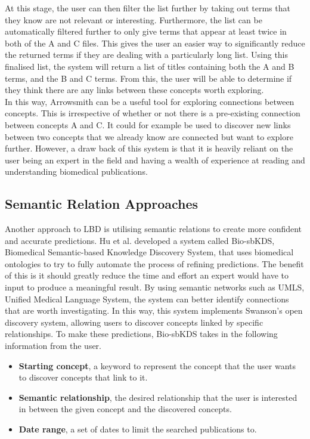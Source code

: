 \documentclass{l4proj}
\begin{document}
At this stage, the user can then filter the list further by taking out terms that they know are not relevant or interesting. Furthermore, the list can be automatically filtered further to only give terms that appear at least twice in both of the A and C files. This gives the user an easier way to significantly reduce the returned terms if they are dealing with a particularly long list. Using this finalised list, the system will return a list of titles containing both the A and B terms, and the B and C terms. From this, the user will be able to determine if they think there are any links between these concepts worth exploring. \\

In this way, Arrowsmith can be a useful tool for exploring connections between concepts. This is irrespective of whether or not there is a pre-existing connection between concepts A and C. It could for example be used to discover new links between two concepts that we already know are connected but want to explore further. However, a draw back of this system is that it is heavily reliant on the user being an expert in the field and having a wealth of experience at reading and understanding biomedical publications. \\ 

\subsection{Semantic Relation Approaches}

Another approach to LBD is utilising semantic relations to create more confident and accurate predictions. Hu et al. developed a system called Bio-sbKDS, Biomedical Semantic-based Knowledge Discovery System, that uses biomedical ontologies to try to fully automate the process of refining predictions. The benefit of this is it should greatly reduce the time and effort an expert would have to input to produce a meaningful result. By using semantic networks such as UMLS, Unified Medical Language System, the system can better identify connections that are worth investigating. In this way, this system implements Swanson's open discovery system, allowing users to discover concepts linked by specific relationships. To make these predictions, Bio-sbKDS takes in the following information from the user. 
\\
\begin{itemize}
    \item \textbf{Starting concept}, a keyword to represent the concept that the user wants to discover concepts that link to it. 
    \item \textbf{Semantic relationship}, the desired relationship that the user is interested in between the given concept and the discovered concepts. 
    \item \textbf{Date range}, a set of dates to limit the searched publications to. \\
\end{itemize}
\end{document}
